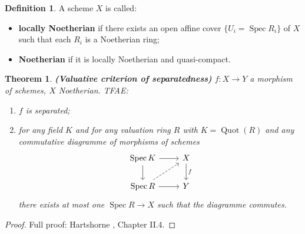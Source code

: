 \documentclass[12pt]{article}
\DeclareMathOperator{\Spec}{Spec}
\DeclareMathOperator{\Quot}{Quot}
\newtheorem*{theorem}{Theorem}
\theoremstyle{definition}
\newtheorem*{definition}{Definition}
\theoremstyle{remark}
\begin{document}
\begin{definition}
A scheme $X$ is called:
\begin{itemize}
\item \textbf{locally Noetherian} if there exists an open affine cover $\{U_i=\Spec R_i\}$ of $X$ such that each $R_i$ is a Noetherian ring;
\item \textbf{Noetherian} if it is locally Noetherian and quasi-compact.
\end{itemize}
\end{definition}

\begin{theorem}
\emph{\textbf{(Valuative criterion of separatedness)}} $f:X\rightarrow Y$ a morphism of schemes, $X$ Noetherian. TFAE:
\begin{enumerate}[label=\arabic*)]
\item\label{separated_morphism} $f$ is separated;
\item\label{uniqueness_limit} for any field $K$ and for any valuation ring $R$ with $K=\Quot(R)$ and any commutative diagramme of morphisms of schemes
\[
\begin{tikzcd}
\Spec K\arrow[r]\arrow[d]&X\arrow[d,"f"]\\
\Spec R\arrow[r]\arrow[ru,dashed]&Y
\end{tikzcd}
\]
there exists at most one $\Spec R\rightarrow X$ such that the diagramme commutes.
\end{enumerate}
\end{theorem}

\begin{proof}
Full proof: Hartshorne \cite{hartshorne2013algebraic}, Chapter II.4.
\end{proof}
\end{document}
